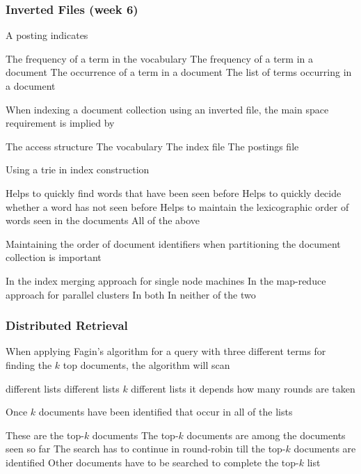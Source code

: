 \documentclass[12pt,a4paper]{exam} %
\begin{document}
\subsubsection{Inverted Files (week 6)}
\begin{questions}
\question A posting indicates
\begin{checkboxes}
\choice The frequency of a term in the vocabulary
\choice The frequency of a term in a document
\CorrectChoice The occurrence of a term in a document
\choice The list of terms occurring in a document
\end{checkboxes}

\question When indexing a document collection using an inverted file, the main space requirement is implied by
\begin{checkboxes}
\choice The access structure
\choice The vocabulary
\choice The index file
\CorrectChoice The postings file
\end{checkboxes}

\question Using a trie in index construction
\begin{checkboxes}
\choice Helps to quickly find words that have been seen before
\choice Helps to quickly decide whether a word has not seen before
\choice Helps to maintain the lexicographic order of words seen in the documents
\CorrectChoice All of the above
\end{checkboxes}

\question Maintaining the order of document identifiers when partitioning the document collection is important
\begin{checkboxes}
\CorrectChoice In the index merging approach for single node machines
\choice In the map-reduce approach for parallel clusters
\choice In both
\choice In neither of the two
\end{checkboxes}

\end{questions}

\subsubsection{Distributed Retrieval}
\begin{questions}

\question When applying Fagin’s algorithm for a query with three different terms for finding the $k$ top documents, the algorithm will scan
\begin{checkboxes}
 different lists
 different lists
\choice $k$ different lists
\choice it depends how many rounds are taken
\end{checkboxes}

\question Once $k$ documents have been identified that occur in all of the lists
\begin{checkboxes}
\choice These are the top-$k$ documents
\CorrectChoice The top-$k$ documents are among the documents seen so far
\choice The search has to continue in round-robin till the top-$k$ documents are identified
\choice Other documents have to be searched to complete the top-$k$ list
\end{checkboxes}
\end{questions}
\end{document}
